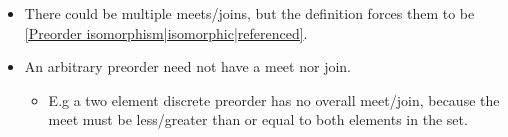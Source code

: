 \begin{itemize}
    \item There could be multiple meets/joins, but the definition forces them to be \ref{Preorder isomorphism|isomorphic|referenced}.
    \item An arbitrary preorder need not have a meet nor join.
          \begin{itemize}
            \item E.g a two element discrete preorder has no overall meet/join, because the meet must be less/greater than or equal to both elements in the set.
          \end{itemize}
  \end{itemize}